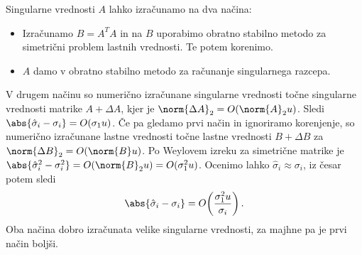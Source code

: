 
Singularne vrednosti $A$ lahko izračunamo na dva načina:
\begin{itemize}
\item Izračunamo $B = A^T A$ in na $B$ uporabimo obratno stabilno metodo za
  simetrični problem lastnih vrednosti.
  Te potem korenimo.
\item $A$ damo v obratno stabilno metodo za računanje singularnega razcepa.
\end{itemize}
V drugem načinu so numerično izračunane singularne vrednosti točne singularne
vrednosti matrike $A + \Delta A$, kjer je $\norm{\Delta A}_2 = O(\norm{A}_2 u)$.
Sledi $\abs{\hat{\sigma}_i - \sigma_i} = O(\sigma_1 u)$.
Če pa gledamo prvi način in ignoriramo korenjenje, so numerično izračunane
lastne vrednosti točne lastne vrednosti $B + \Delta B$ za $\norm{\Delta B}_2 =
O(\norm{B} u)$.
Po Weylovem izreku za simetrične matrike je $\abs{\hat{\sigma}_i^2 - \sigma_i^2}
= O(\norm{B}_2 u) = O(\sigma_1^2 u)$.
Ocenimo lahko $\hat{\sigma}_i \approx \sigma_i$, iz česar potem sledi
\[
  \abs{\hat{\sigma}_i - \sigma_i} = O\!\left( \frac{\sigma_1^2 u}{\sigma_i}
  \right).
\]
Oba načina dobro izračunata velike singularne vrednosti, za majhne pa je prvi
način boljši.


